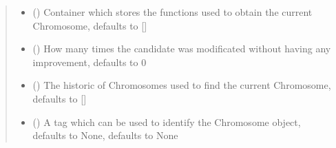 \documentclass[letterpaper,10pt,english]{sphinxmanual}
\begin{document}
\begin{fulllineitems}
\begin{quote}
\begin{description}
\begin{itemize}
\item {} 
\sphinxAtStartPar
{} (\sphinxstyleliteralemphasis{\sphinxupquote{{[}}}\sphinxstyleliteralemphasis{\sphinxupquote{{[}}}\sphinxstyleliteralemphasis{\sphinxupquote{{[}}}{\hyperref[\detokenize{genetic:genetic.Chromosome}]{\sphinxcrossref{\sphinxstyleliteralemphasis{\sphinxupquote{Chromosome}}}}}\sphinxstyleliteralemphasis{\sphinxupquote{{]}}}\sphinxstyleliteralemphasis{\sphinxupquote{, }}\sphinxstyleliteralemphasis{\sphinxupquote{{]}}}\sphinxstyleliteralemphasis{\sphinxupquote{{]}}}\sphinxstyleliteralemphasis{\sphinxupquote{, }}) \textendash{} Container which stores the functions used to obtain the current Chromosome, defaults to {[}{]}

\item {} 
\sphinxAtStartPar
{} (\sphinxstyleliteralemphasis{\sphinxupquote{, }}) \textendash{} How many times the candidate was modificated without having any improvement, defaults to 0

\item {} 
\sphinxAtStartPar
{} (\sphinxstyleliteralemphasis{\sphinxupquote{{[}}}{\hyperref[\detokenize{genetic:genetic.Chromosome}]{\sphinxcrossref{\sphinxstyleliteralemphasis{\sphinxupquote{Chromosome}}}}}\sphinxstyleliteralemphasis{\sphinxupquote{{]}}}\sphinxstyleliteralemphasis{\sphinxupquote{, }}) \textendash{} The historic of Chromosomes used to find the current Chromosome, defaults to {[}{]}

\item {} 
\sphinxAtStartPar
{} (\sphinxstyleliteralemphasis{\sphinxupquote{, }}) \textendash{} A tag which can be used to identify the Chromosome object, defaults to None, defaults to None

\end{itemize}

\end{description}\end{quote}


\end{fulllineitems}
\end{document}
